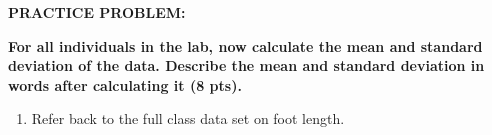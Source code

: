 \textbf{PRACTICE PROBLEM:}

\textbf{For all individuals in the lab, now calculate the mean and
standard deviation of the data. Describe the mean and standard deviation
in words after calculating it (8 pts). }

\begin{enumerate}
\def\labelenumi{\alph{enumi}.}
\item
  Refer back to the full class data set on foot length.
\end{enumerate}
